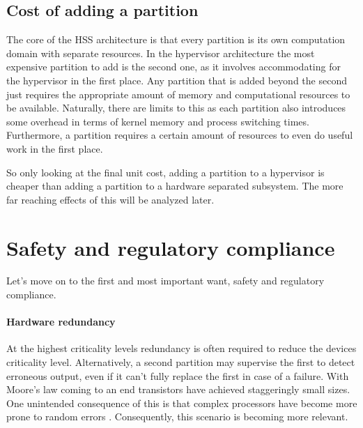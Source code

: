 \subsection{Cost of adding a partition}
The core of the \gls{HSS} architecture is that every partition is its own computation domain with separate resources. In the hypervisor architecture the most expensive partition to add is the second one, as it involves accommodating for the hypervisor in the first place. Any partition that is added beyond the second just requires the appropriate amount of memory and computational resources to be available. Naturally, there are limits to this as each partition also introduces some overhead in terms of kernel memory and process switching times.  Furthermore, a partition requires a certain amount of resources to even do useful work in the first place.


So only looking at the final unit cost, adding a partition to a hypervisor is cheaper than adding a partition to a hardware separated subsystem. The more far reaching effects of this will be analyzed later.

\section{Safety and regulatory compliance \label{safety-analysis}}
 Let's move on to the first and most important want, safety and regulatory compliance. 
 \paragraph{Hardware redundancy}
 At the highest criticality levels redundancy is often required to reduce the devices criticality level. Alternatively, a second partition may supervise the first to detect erroneous output, even if it can't fully replace the first in case of a failure. With Moore's law coming to an end transistors have achieved staggeringly small sizes. One unintended consequence of this is that complex processors have become more prone to random errors \cite{Constantinescu.2003}. Consequently, this scenario is becoming more relevant.
 
